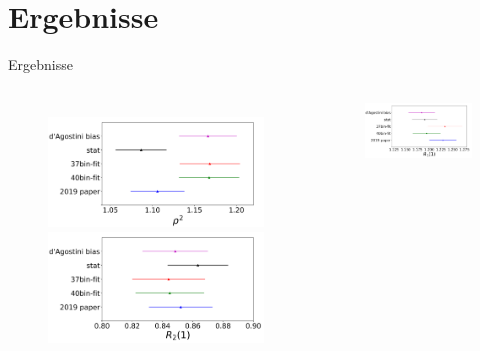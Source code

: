 \documentclass{beamer}
\begin{document}
\section{Ergebnisse}
\begin{frame}{Ergebnisse}
\begin{columns}
\begin{figure}[htbp]
   \centering
    \includegraphics[width=1.0\textwidth]{./Bilder/CLN_all_1}
    \includegraphics[width=1.0\textwidth]{./Bilder/CLN_all_3}
\end{figure}  
\begin{figure}[htbp]
   \centering
    \includegraphics[width=1.0\textwidth]{./Bilder/CLN_all_2}

\end{figure}
\end{columns}
\end{frame}
\end{document}
